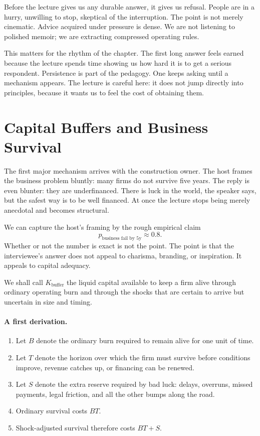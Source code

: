 Before the lecture gives us any durable answer, it gives us refusal. People are in a hurry, unwilling to stop, skeptical of the interruption. The point is not merely cinematic. Advice acquired under pressure is dense. We are not listening to polished memoir; we are extracting compressed operating rules.

This matters for the rhythm of the chapter. The first long answer feels earned because the lecture spends time showing us how hard it is to get a serious respondent. Persistence is part of the pedagogy. One keeps asking until a mechanism appears. The lecture is careful here: it does not jump directly into principles, because it wants us to feel the cost of obtaining them.

\section{Capital Buffers and Business Survival}

The first major mechanism arrives with the construction owner. The host frames the business problem bluntly: many firms do not survive five years. The reply is even blunter: they are underfinanced. There is luck in the world, the speaker says, but the safest way is to be well financed. At once the lecture stops being merely anecdotal and becomes structural.

We can capture the host's framing by the rough empirical claim
\begin{equation}
p_{\text{business fail by 5y}} \approx 0.8.
\end{equation}
Whether or not the number is exact is not the point. The point is that the interviewee's answer does not appeal to charisma, branding, or inspiration. It appeals to capital adequacy.

\begin{definition}
We shall call \(K_{\text{buffer}}\) the liquid capital available to keep a firm alive through ordinary operating burn and through the shocks that are certain to arrive but uncertain in size and timing.
\end{definition}

\paragraph{A first derivation.}
\begin{enumerate}
\item Let \(B\) denote the ordinary burn required to remain alive for one unit of time.
\item Let \(T\) denote the horizon over which the firm must survive before conditions improve, revenue catches up, or financing can be renewed.
\item Let \(S\) denote the extra reserve required by bad luck: delays, overruns, missed payments, legal friction, and all the other bumps along the road.
\item Ordinary survival costs \(BT\).
\item Shock-adjusted survival therefore costs \(BT+S\).
\end{enumerate}

